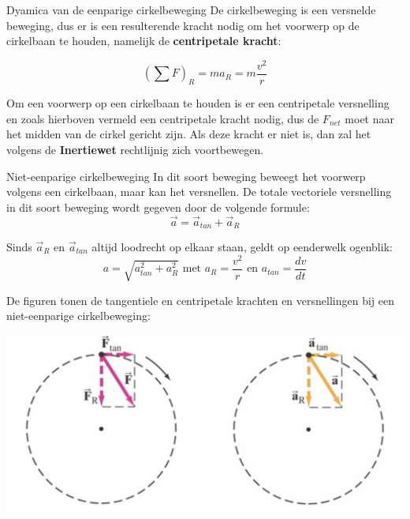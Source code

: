 \newpage

\begin{theo}{Dyamica van de eenparige cirkelbeweging}
    De cirkelbeweging is een versnelde beweging, dus er is een resulterende kracht nodig om het voorwerp op de cirkelbaan te houden, namelijk de \textbf{centripetale kracht}:

    \begin{equation*}
        (\sum F)_R = ma_R = m\dfrac{v^2}{r}
    \end{equation*}
    
    \noindent Om een voorwerp op een cirkelbaan te houden is er een centripetale versnelling en zoals hierboven vermeld een centripetale kracht nodig, dus de $ F_{net} $ moet naar het midden van de cirkel gericht zijn. Als deze kracht er niet is, dan zal het volgens de \textbf{Inertiewet} rechtlijnig zich voortbewegen.
\end{theo}
 
\begin{theo}{Niet-eenparige cirkelbeweging}
    In dit soort beweging beweegt het voorwerp volgens een cirkelbaan, maar kan het versnellen. De totale vectoriele versnelling in dit soort beweging wordt gegeven door de volgende formule:
    \begin{equation*}
        \Vec{a} = \Vec{a}_{tan} + \Vec{a}_R 
    \end{equation*}

    \noindent Sinds $ \Vec{a}_R $ en $ \Vec{a}_{tan} $ altijd loodrecht op elkaar staan, geldt op eenderwelk ogenblik:
        \begin{equation*}
            a = \sqrt{a_{tan}^2 + a_R^2} \text{ met } a_R = \dfrac{v^2}{r} \text{ en } a_{tan} = \dfrac{dv}{dt}
        \end{equation*}

    \noindent De figuren tonen de tangentiele en centripetale krachten en versnellingen bij een niet-eenparige cirkelbeweging:
    
        \begin{center}
            \includegraphics[scale = 0.20]{Images/Dynamica/Niet-Eenparige Cirkelbeweging.png} 
        \end{center}
\end{theo}

